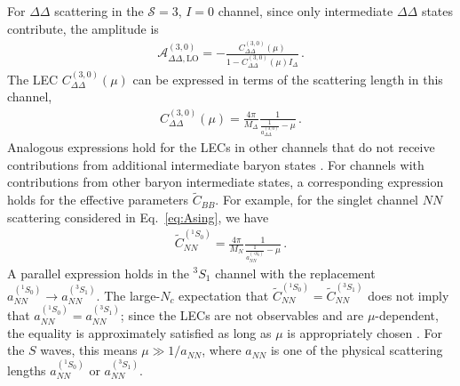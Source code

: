 \documentclass[nofootinbib, preprint, aps, prc, superscriptaddress,11pt]{revtex4-1}
\newcommand{\Nc}{\ensuremath{N_c}\xspace}
\newcommand{\NN}{\ensuremath{N\!N}\xspace}
\newcommand{\oneS}{\ensuremath{{{}^{1}\!S_0}}\xspace}
\newcommand{\threeS}{\ensuremath{{{}^{3}\!S_1}}\xspace}
\newcommand{\calA}{\ensuremath{\mathcal{A}}}
\newcommand{\1}{\mathbbm{1}}
\newcommand{\CeffSing}{\ensuremath{\widetilde C_{\NN}^{(\oneS)}}\xspace}
\newcommand{\CeffTrip}{\ensuremath{\widetilde C_{\NN}^{(\threeS)}}\xspace}
\newcommand{\CDDsevenSIzero}{C_{\DD}^{(3,0)}}
\newcommand{\asing}{\ensuremath{a_{\NN}^{(^1 \! S_0)}}\xspace}
\newcommand{\atrip}{\ensuremath{a_{\NN}^{(^3 \! S_1)}}\xspace}
\newcommand{\aNN}{\ensuremath{a_{\NN}}\xspace}
\newcommand{\D}{\ensuremath{\Delta}\xspace}
\newcommand{\DD}{\ensuremath{\Delta\Delta}\xspace}
\begin{document}
For \DD scattering in the $\mathscr{S} = 3$, $I=0$ channel, since only intermediate \DD states contribute, the amplitude is 
\begin{align}
\label{eq:DDAmp30}
    \calA_{\DD,\text{LO}}^{(3,0)} = - \frac{\CDDsevenSIzero(\mu) }{1 -\CDDsevenSIzero(\mu) I_{\D} } \, .
\end{align}
The LEC $\CDDsevenSIzero(\mu)$ can be expressed in terms of the scattering length in this channel, 
\begin{align}
   \label{eq:LECgeneral} \CDDsevenSIzero(\mu) = \frac{4\pi}{M_{\D}}\frac{1}{\frac{1}{a_{\DD}^{(3,0)}}-\mu} \, .
\end{align}
Analogous expressions hold for the LECs in other channels that do not receive contributions from additional intermediate baryon states \cite{Kaplan:1998we}. 
For channels with contributions from other baryon intermediate states, a corresponding expression holds for the effective parameters $\widetilde C_{BB}$. For example, for the singlet channel \NN scattering considered in Eq.~\eqref{eq:Asing}, we have
\begin{align}
\label{eq:CeffGeneral}
\CeffSing=\frac{4 \pi}{M_N}\frac{1}{\frac{1}{\asing} - \mu} \, .
\end{align}
A parallel expression holds in the \threeS channel with the replacement $\asing \to \atrip$.
The large-\Nc expectation that $\CeffSing = \CeffTrip$ does not imply that $\asing=\atrip$; since the LECs are not observables and are $\mu$-dependent, the equality is approximately satisfied as long as $\mu$ is appropriately chosen \cite{Kaplan:1995yg}. 
For the $S$ waves, this means $\mu\gg 1/\aNN$, where \aNN is one of the physical scattering lengths \asing or \atrip.
\end{document}
